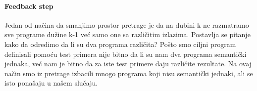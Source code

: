 \paragraph{Feedback step}
Jedan od načina da smanjimo prostor pretrage je da na dubini k ne razmatramo sve programe dužine k-1 već samo one sa različitim izlazima. Postavlja se pitanje kako da odredimo da li su dva programa različita? Pošto smo ciljni program definisali pomoću test primera nije bitno da li su nam dva programa semantički jednaka, već nam je bitno da  za iste test primere daju različite rezultate. Na ovaj način smo iz pretrage izbacili mnogo programa koji nisu
semantički jednaki, ali se isto ponašaju u našem slučaju.
